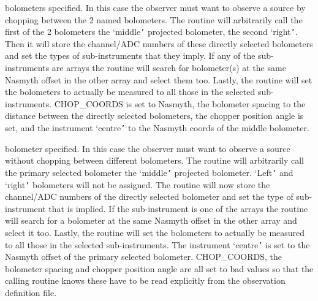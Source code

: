 {{{          bolometers specified. In this case the observer must want to observe
          a source by chopping between the 2 named bolometers.
            The routine will arbitrarily call the first of the 2 bolometers
          the `middle{\tt '} projected bolometer, the second `right{\tt '}. Then it will
          store the channel/ADC numbers of these directly selected bolometers and
          set the types of sub-instruments that they imply. If any of the
          sub-instruments are arrays the routine will search for bolometer(s)
          at the same Nasmyth offset in the other array and select them too.
            Lastly, the routine will set the bolometers to actually be measured
          to all those in the selected sub-instruments. CHOP\_COORDS is set to
          Nasmyth, the bolometer spacing to the distance between the
          directly selected bolometers, the chopper position angle is set, and
          the instrument `centre{\tt '} to the Nasmyth coords of the middle bolometer.

          bolometer specified. In this case the observer must want to observe
          a source without chopping between different bolometers.
            The routine will arbitrarily call the primary selected bolometer
          the `middle{\tt '} projected bolometer. `Left{\tt '} and `right{\tt '} bolometers will
          not be assigned.
            The routine will now store the channel/ADC numbers of the directly
          selected bolometer and set the type of sub-instrument that is implied.
          If the sub-instrument is one of the arrays the routine will search
          for a bolometer at the same Nasmyth offset in the other array and
          select it too.
            Lastly, the routine will set the bolometers to actually be measured
          to all those in the selected sub-instruments. The instrument `centre{\tt '}
          is set to the Nasmyth offset of the primary selected bolometer.
          CHOP\_COORDS, the bolometer spacing and chopper position angle are
          all set to bad values so that the calling routine knows these have to
          be read explicitly from the observation definition file.

}}}

